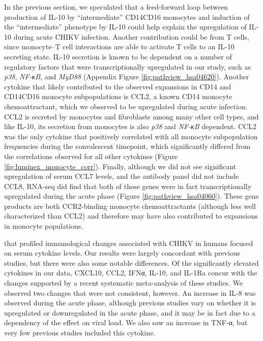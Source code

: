 In the previous section, we speculated that a feed-forward loop between production of IL-10 by “intermediate” CD14\sups{++}\allowbreak CD16\sups{+} monocytes\autocite{Skrzeczynska-Moncznik2008} and induction of the “intermediate” phenotype by IL-10\autocite{Tsukamoto2017} could help explain the upregulation of IL-10 during acute CHIKV infection. Another contribution could be from T cells, since monocyte–T cell interactions are able to activate T cells to an IL-10 secreting state.\autocite{Charron2015} IL-10 secretion is known to be dependent on a number of regulatory factors that were transcriptionally upregulated in our study, such as \emph{p38}, \emph{NF-κΒ}, and \emph{MyD88} (Appendix Figure \ref{fig:pathview_hsa04620}).\autocite{Saraiva2010} Another cytokine that likely contributed to the observed expansions in CD14\sups{+} and CD14\sups{+}\allowbreak CD16\sups{+} monocyte subpopulations is CCL2, a known CD14\sups{+} monocyte chemoattractant,\autocite{Serbina2008} which we observed to be upregulated during acute infection. CCL2 is secreted by monocytes and fibroblasts among many other cell types,\autocite{VanDamme1994} and like IL-10, its secretion from monocytes is also \emph{p38} and \emph{NF-κB} dependent.\autocite{Fietta2002} CCL2 was the only cytokine that positively correlated with all monocyte subpopulation frequencies during the convalescent timepoint, which significantly differed from the correlations observed for all other cytokines (Figure \ref{fig:luminex_monocyte_corr}). Finally, although we did not see significant upregulation of serum CCL7 levels, and the antibody panel did not include CCL8, RNA-seq did find that both of these genes were in fact transcriptionally upregulated during the acute phase (Figure \ref{fig:pathview_hsa04060}). These gene products are both CCR2-binding monocyte chemoattractants (although less well characterized than CCL2) and therefore may have also contributed to expansions in monocyte populations.

 that profiled immunological changes associated with CHIKV in humans focused on serum cytokine levels.\autocite{Chaaitanya2011,Chow2011,Ng2009,Schilte2013,Teng2015} Our results were largely concordant with previous studies, but there were also some notable differences. Of the significantly elevated cytokines in our data, CXCL10, CCL2, IFNα, IL-10, and IL-1Ra concur with the changes supported by a recent systematic meta-analysis of these studies.\autocite{Teng2015} We observed two changes that were not consistent, however. An increase in IL-8 was observed during the acute phase, although previous studies vary on whether it is upregulated or downregulated in the acute phase, and it may be in fact due to a dependency of the effect on viral load.\autocite{Teng2015} We also saw an increase in TNF-α, but very few previous studies included this cytokine.


